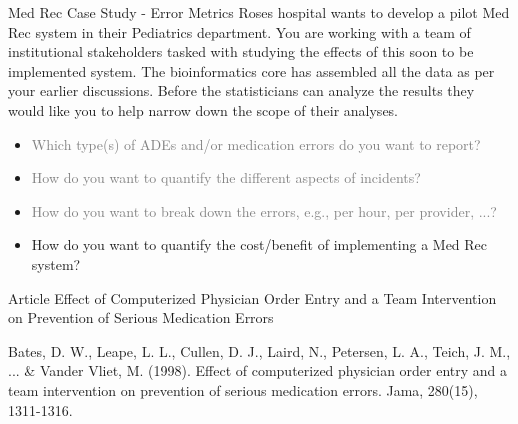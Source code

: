 \documentclass[10pt]{beamer}
\begin{document}
\begin{frame}{Med Rec Case Study - Error Metrics}
	Roses hospital wants to develop a pilot Med Rec system in their Pediatrics department.  You are working with a team of institutional stakeholders tasked with studying the effects of this soon to be implemented system.  The bioinformatics core has assembled all the data as per your earlier discussions.  Before the statisticians can analyze the results they would like you to help narrow down the scope of their analyses.
	\begin{itemize}
		\item \textcolor<2->{gray}{Which type(s) of ADEs and/or medication errors do you want to report?}
		\item \textcolor<2->{gray}{How do you want to quantify the different aspects of incidents?}
		\item \textcolor<2->{gray}{How do you want to break down the errors, e.g., per hour, per provider, ...?}
		\item<2-> How do you want to quantify the cost/benefit of implementing a Med Rec system?
	\end{itemize}	 
\end{frame}


\begin{frame}{Article}
	\Large{Effect of Computerized Physician Order Entry and a Team Intervention on Prevention of Serious Medication Errors}
	
	
	\scriptsize{Bates, D. W., Leape, L. L., Cullen, D. J., Laird, N., Petersen, L. A., Teich, J. M., ... \& Vander Vliet, M. (1998). Effect of computerized physician order entry and a team intervention on prevention of serious medication errors. Jama, 280(15), 1311-1316.}
\end{frame}
\end{document}
